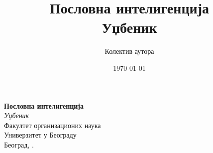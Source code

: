 \documentclass[11pt,b5paper,oneside,openany]{book}
\title{\Huge \textbf{Пословна интелигенција}\\[0.5em]\Large Уџбеник}
\author{Колектив аутора}
\date{\today}
\begin{document}
\begin{titlepage}
  \centering
  \vspace*{3cm}
  {\Huge \textbf{Пословна интелигенција}}\\[1.2cm]
  {\Large \textit{Уџбеник}}\\[2.5cm]
  {\large Факултет организационих наука}\\[0.5cm]
  {\large Универзитет у Београду}\\[3cm]
  \vfill
  {\large Београд, \the\year.}
\end{titlepage}

\frontmatter
\tableofcontents
\cleardoublepage

\mainmatter






\backmatter
\end{document}
